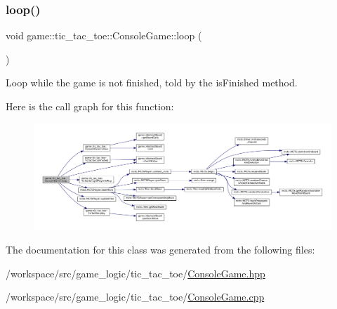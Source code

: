 \subsubsection{\texorpdfstring{loop()}{loop()}}
{\footnotesize\ttfamily void game\+::tic\+\_\+tac\+\_\+toe\+::\+Console\+Game\+::loop (\begin{DoxyParamCaption}{ }\end{DoxyParamCaption})}



Loop while the game is not finished, told by the {\ttfamily is\+Finished} method. 

Here is the call graph for this function\+:
\nopagebreak
\begin{figure}[H]
\begin{center}
\leavevmode
\includegraphics[width=350pt]{classgame_1_1tic__tac__toe_1_1_console_game_a06b07e4c713a60999258b0b573b02a33_cgraph}
\end{center}
\end{figure}


The documentation for this class was generated from the following files\+:\begin{DoxyCompactItemize}
\item 
/workspace/src/game\+\_\+logic/tic\+\_\+tac\+\_\+toe/\hyperlink{tic__tac__toe_2_console_game_8hpp}{Console\+Game.\+hpp}\item 
/workspace/src/game\+\_\+logic/tic\+\_\+tac\+\_\+toe/\hyperlink{tic__tac__toe_2_console_game_8cpp}{Console\+Game.\+cpp}\end{DoxyCompactItemize}

